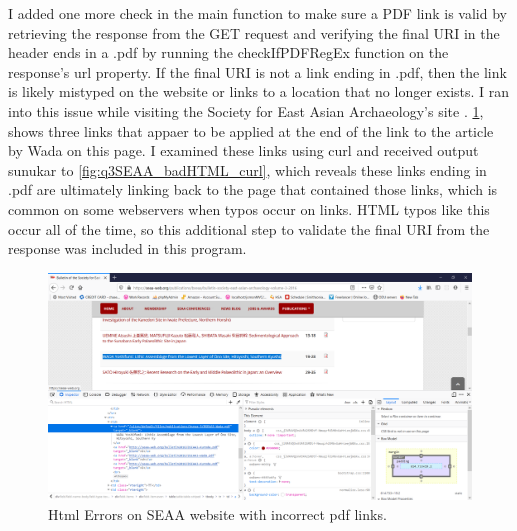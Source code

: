 \documentclass[12pt]{article}
\begin{document}
I added one more check in the main function to make sure a PDF link is valid by retrieving the response from the GET request and verifying the final URI in the header ends in a .pdf by running the checkIfPDFRegEx function on the response's url property. If the final URI is not a link ending in .pdf, then the link is likely mistyped on the website or links to a location that no longer exists. I ran into this issue while visiting the Society for East Asian Archaeology's site \cite{bulletin2016SEAA}.  \ref{fig:q3SEAA_badHTML}, shows three links that appaer to be applied at the end of the link to the article by Wada on this page. I examined these links using curl and received output sunukar to \ref{fig:q3SEAA_badHTML_curl}, which reveals these links ending in .pdf are ultimately linking back to the page that contained those links, which is common on some webservers when typos occur on links. HTML typos like this occur all of the time, so this additional step to validate the final URI from the response was included in this program.

\begin{figure}[H]
    \centering
    \includegraphics[trim=0 60 10 20, clip, width=\textwidth] {Q3/seaaBadHTML.png}
    \caption{Html Errors on SEAA website with incorrect pdf links. }
    \label{fig:q3SEAA_badHTML}
\end{figure}
\end{document}
